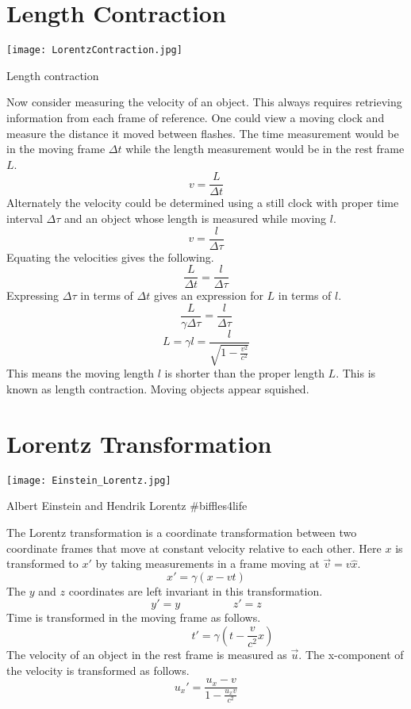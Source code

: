 \section{Length Contraction}

\begin{marginfigure}[180pt]
  \texttt{[image: LorentzContraction.jpg]}
  \caption{Length contraction}
  \label{fig:marginfig}
\end{marginfigure}
Now consider measuring the velocity of an object.  This always requires retrieving information from each frame of reference.  One could view a moving clock and measure the distance it moved between flashes.  The time measurement would be in the moving frame $\Delta t$ while the length measurement would be in the rest frame $L$.  
$$v=\frac{L}{\Delta t}$$
Alternately the velocity could be determined using a still clock with proper time interval $\Delta \tau$ and an object whose length is measured while moving $l$.
$$v=\frac{l}{\Delta \tau}$$
Equating the velocities gives the following.
$$\frac{L}{\Delta t}=\frac{l}{\Delta \tau}$$
Expressing $\Delta \tau$ in terms of $\Delta t$ gives an expression for $L$ in terms of $l$.
$$\frac{L}{	\gamma \Delta \tau}=\frac{l}{\Delta \tau}$$
$$L=\gamma l=\frac{l}{\sqrt{1-\frac{v^2}{c^2}}}$$
This means the moving length $l$ is shorter than the proper length $L$.  This is known as length contraction.  Moving objects appear squished.


\section{Lorentz Transformation}
\begin{marginfigure}[50pt]
  \texttt{[image: Einstein\_Lorentz.jpg]}
  \caption{Albert Einstein and Hendrik Lorentz \#biffles4life}
  \label{fig:marginfig}
\end{marginfigure}

The Lorentz transformation is a coordinate transformation between two coordinate frames that move at constant velocity relative to each other.  Here $x$ is transformed to $x'$ by taking measurements in a frame moving at $\overrightarrow{v}=v\hat{x}$.  $$x'= \gamma(x-vt)$$ 
The $y$ and $z$ coordinates are left invariant in this transformation.  
$$ y'=y \hspace{2cm}z'= z$$
Time is transformed in the moving frame as follows.
$$ \hspace{2cm} t'=\gamma \left( t -\frac{v}{c^2}x\right)$$
The velocity of an object in the rest frame is measured as $\overrightarrow{u}$.  The x-component of the velocity is transformed as follows.
$$u_x'=\frac{u_x-v}{1-\frac{u_xv}{c^2}}$$

